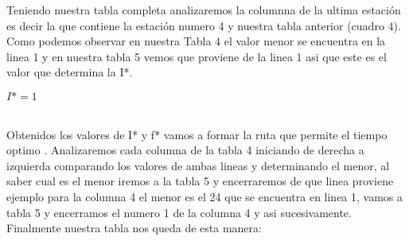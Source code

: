 \documentclass[12pt,twoside]{article}
\begin{document}
Teniendo nuestra tabla completa analizaremos la columnna de la ultima estación es decir la que contiene la estación numero 4 y nuestra tabla anterior (cuadro 4).
Como podemos observar en nuestra Tabla 4 el valor menor se encuentra en la linea 1 y en nuestra tabla 5 vemos que proviene de la linea 1 asi que este es el valor que determina la I*.
\begin{center}
   $I* = 1$
\end{center}
\\
Obtenidos los valores de I* y f* vamos a formar la ruta que permite el tiempo optimo . Analizaremos cada columna de la tabla 4 iniciando de derecha a izquierda comparando los valores de ambas lineas y determinando el menor, al saber cual es el menor iremos a la tabla 5 y encerraremos de que linea proviene ejemplo para la columna 4 el menor es el 24 que se encuentra en linea 1, vamos a tabla 5 y encerramos el numero 1 de la columna 4 y asi sucesivamente.
Finalmente nuestra tabla nos queda de esta manera:
\end{document}
